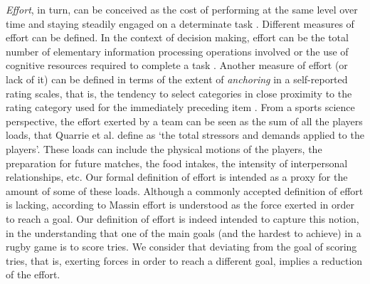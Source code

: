 \documentclass[]{article}
\begin{document}
\textit{Effort}, in turn, can be conceived as the cost of performing at the same level over time and staying steadily engaged on a determinate task \cite{herlambang2021modeling}. Different measures of effort can be defined. In the context of decision making, effort can be the total number of elementary information processing operations involved \cite{payne1995trading} or the use of cognitive resources required to complete a task \cite{russo1983strategies,johnson1985effort}. Another measure of effort (or lack of it) can be defined in terms of the extent of {\em anchoring} in a self-reported rating scales, that is, the tendency to select categories in close proximity to the rating category used for the immediately preceding item \cite{lyu2022psychometric}. From a sports science perspective, the effort exerted by a team can be seen as the sum of all the players loads, that Quarrie et al. \cite{quarrie2017managing} define as `the total stressors and demands applied to the players'. These loads can include the physical motions of the players, the preparation for future matches, the food intakes, the intensity of interpersonal relationships, etc. Our formal definition of effort is intended as a proxy for the amount of some of these loads. Although a commonly accepted definition of effort is lacking, according to Massin \cite{massin2017towards} effort is understood as the force exerted in order to reach a goal. Our definition of effort is indeed intended to capture this notion, in the understanding that one of the main goals (and the hardest to achieve) in a rugby game is to score tries. We consider that deviating from the goal of scoring tries, that is, exerting forces in order to reach a different goal, implies a reduction of the effort.\\
\end{document}

